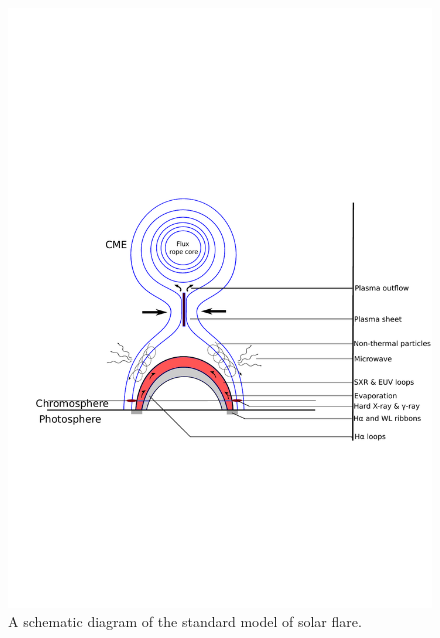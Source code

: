 \begin{figure}[ht!]
    \centering
    \hspace{5cm}
    \includegraphics[trim={1cm 8cm 0cm 8cm}, clip, width=0.95\linewidth]{Figures/std_mod.pdf}
    \caption{A schematic diagram of the standard model of solar flare.}
    \label{fig:std_mod}
\end{figure}

